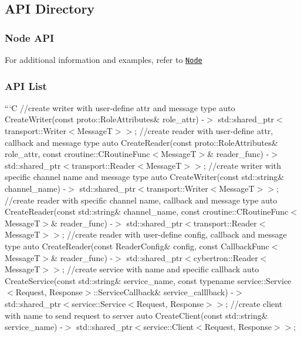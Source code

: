 {\ttfamily \subsection*{A\-P\-I Directory}}

{\ttfamily }

{\ttfamily \subsubsection*{Node A\-P\-I}}

{\ttfamily  For additional information and examples, refer to \href{#node}{\tt Node}}

{\ttfamily \subsubsection*{A\-P\-I List}}

{\ttfamily }

{\ttfamily ```\-C //create writer with user-\/define attr and message type auto Create\-Writer(const proto\-::\-Role\-Attributes\& role\-\_\-attr) -\/$>$ std\-::shared\-\_\-ptr$<$transport\-::\-Writer$<$\-Message\-T$>$$>$; //create reader with user-\/define attr, callback and message type auto Create\-Reader(const proto\-::\-Role\-Attributes\& role\-\_\-attr, const croutine\-::\-C\-Routine\-Func$<$\-Message\-T$>$\& reader\-\_\-func) -\/$>$ std\-::shared\-\_\-ptr$<$transport\-::\-Reader$<$\-Message\-T$>$$>$; //create writer with specific channel name and message type auto Create\-Writer(const std\-::string\& channel\-\_\-name) -\/$>$ std\-::shared\-\_\-ptr$<$transport\-::\-Writer$<$\-Message\-T$>$$>$; //create reader with specific channel name, callback and message type auto Create\-Reader(const std\-::string\& channel\-\_\-name, const croutine\-::\-C\-Routine\-Func$<$\-Message\-T$>$\& reader\-\_\-func) -\/$>$ std\-::shared\-\_\-ptr$<$transport\-::\-Reader$<$\-Message\-T$>$$>$; //create reader with user-\/define config, callback and message type auto Create\-Reader(const Reader\-Config\& config, const Callback\-Func$<$\-Message\-T$>$\& reader\-\_\-func) -\/$>$ std\-::shared\-\_\-ptr$<$cybertron\-::\-Reader$<$\-Message\-T$>$$>$; //create service with name and specific callback auto Create\-Service(const std\-::string\& service\-\_\-name, const typename service\-::\-Service$<$\-Request, Response$>$\-::\-Service\-Callback\& service\-\_\-calllback) -\/$>$ std\-::shared\-\_\-ptr$<$service\-::\-Service$<$\-Request, Response$>$$>$; //create client with name to send request to server auto Create\-Client(const std\-::string\& service\-\_\-name) -\/$>$ std\-::shared\-\_\-ptr$<$service\-::\-Client$<$\-Request, Response$>$$>$;}

